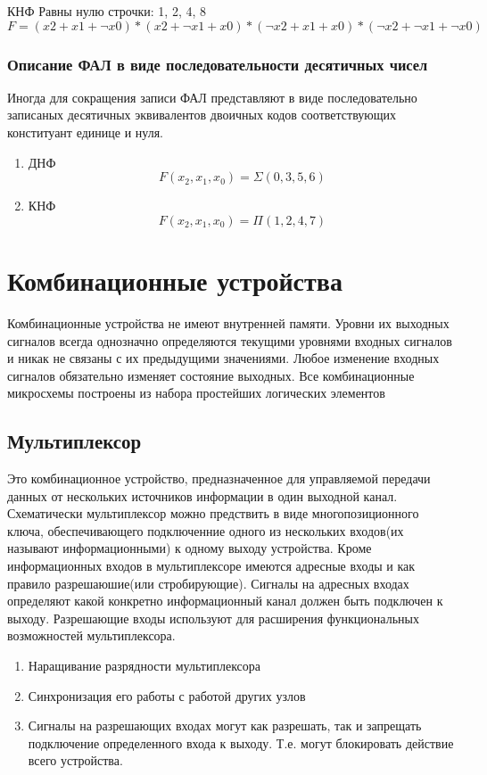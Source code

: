 \documentclass[a4paper]{article}
\begin{document}


КНФ
Равны нулю строчки: 1, 2, 4, 8
$$ F = (x2+x1+\neg x0)*(x2+\neg x1+x0)*(\neg x2+x1+x0)*(\neg x2+\neg x1+\neg x0)$$



\subsubsection{Описание ФАЛ в виде последовательности десятичных чисел}
Иногда для сокращения записи ФАЛ представляют в виде последовательно записаных десятичных эквивалентов двоичных кодов соответствующих конституант единице и нуля.

\begin{enumerate}
\item ДНФ
$$ F(x_2, x_1, x_0) = \Sigma(0, 3, 5, 6) $$
\item КНФ
$$ F(x_2, x_1, x_0) = \Pi(1, 2, 4, 7) $$
\end{enumerate}

\section{Комбинационные устройства}
Комбинационные устройства не имеют внутренней памяти.
Уровни их выходных сигналов всегда однозначно определяются текущими уровнями входных сигналов и никак не связаны с их предыдущими значениями.
Любое изменение входных сигналов обязательно изменяет состояние выходных.
Все комбинационные микросхемы построены из набора простейших логических элементов
\subsection{Мультиплексор}
Это комбинационное устройство, предназначенное для управляемой передачи данных от нескольких источников информации в один 
выходной канал.
Схематически мультиплексор можно предствить в виде многопозиционного ключа, обеспечивающего подключенние одного из нескольких входов(их называют информационными) к одному выходу устройства.
Кроме информационных входов в мультиплексоре имеются адресные входы и как правило разрешаюшие(или стробирующие).
Сигналы на адресных входах определяют какой конкретно информационный канал должен быть подключен к выходу.
Разрешающие входы используют для расширения функциональных возможностей мультиплексора.

\begin{enumerate}
    \item Наращивание разрядности мультиплексора
    \item Синхронизация его работы с работой других узлов
    \item Сигналы на разрешающих входах могут как разрешать, так и запрещать подключение определенного входа к выходу. Т.е. могут блокировать действие всего устройства.
\end{enumerate}
\end{document}
